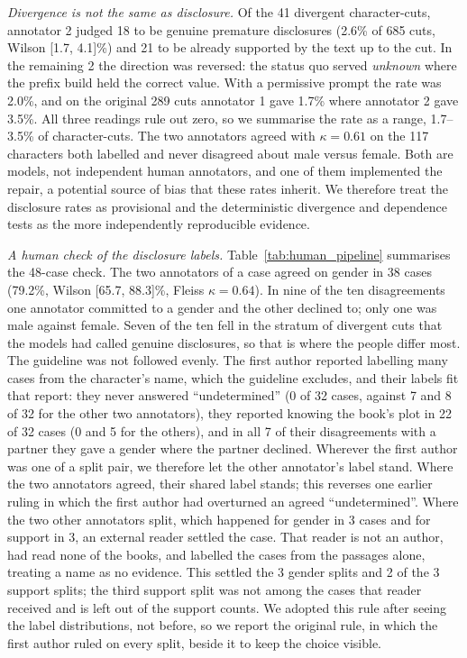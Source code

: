 \documentclass[sn-mathphys]{sn-jnl}%
\theoremstyle{thmstyleone}%
\theoremstyle{thmstyletwo}%
\theoremstyle{thmstylethree}%
\begin{document}
\emph{Divergence is not the same as disclosure.} Of the 41 divergent character-cuts, annotator 2 judged 18 to be genuine premature disclosures (2.6\% of 685 cuts, Wilson [1.7, 4.1]\%) and 21 to be already supported by the text up to the cut. In the remaining 2 the direction was reversed: the status quo served \emph{unknown} where the prefix build held the correct value. With a permissive prompt the rate was 2.0\%, and on the original 289 cuts annotator 1 gave 1.7\% where annotator 2 gave 3.5\%. All three readings rule out zero, so we summarise the rate as a range, 1.7--3.5\% of character-cuts. The two annotators agreed with $\kappa=0.61$ on the 117 characters both labelled and never disagreed about male versus female. Both are models, not independent human annotators, and one of them implemented the repair, a potential source of bias that these rates inherit. We therefore treat the disclosure rates as provisional and the deterministic divergence and dependence tests as the more independently reproducible evidence.

\emph{A human check of the disclosure labels.} Table~\ref{tab:human_pipeline} summarises the 48-case check. The two annotators of a case agreed on gender in 38 cases (79.2\%, Wilson [65.7, 88.3]\%, Fleiss $\kappa=0.64$). In nine of the ten disagreements one annotator committed to a gender and the other declined to; only one was male against female. Seven of the ten fell in the stratum of divergent cuts that the models had called genuine disclosures, so that is where the people differ most. The guideline was not followed evenly. The first author reported labelling many cases from the character's name, which the guideline excludes, and their labels fit that report: they never answered ``undetermined'' (0 of 32 cases, against 7 and 8 of 32 for the other two annotators), they reported knowing the book's plot in 22 of 32 cases (0 and 5 for the others), and in all 7 of their disagreements with a partner they gave a gender where the partner declined. Wherever the first author was one of a split pair, we therefore let the other annotator's label stand. Where the two annotators agreed, their shared label stands; this reverses one earlier ruling in which the first author had overturned an agreed ``undetermined''. Where the two other annotators split, which happened for gender in 3 cases and for support in 3, an external reader settled the case. That reader is not an author, had read none of the books, and labelled the cases from the passages alone, treating a name as no evidence. This settled the 3 gender splits and 2 of the 3 support splits; the third support split was not among the cases that reader received and is left out of the support counts. We adopted this rule after seeing the label distributions, not before, so we report the original rule, in which the first author ruled on every split, beside it to keep the choice visible.
\end{document}
